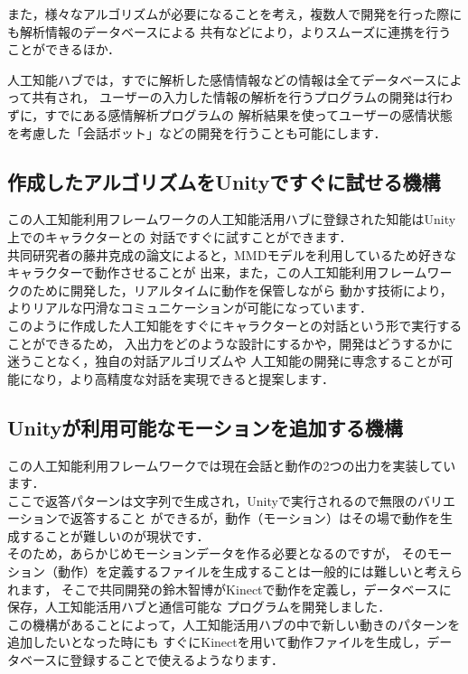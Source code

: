 また，様々なアルゴリズムが必要になることを考え，複数人で開発を行った際にも解析情報のデータベースによる
共有などにより，よりスムーズに連携を行うことができるほか．

人工知能ハブでは，すでに解析した感情情報などの情報は全てデータベースによって共有され，
ユーザーの入力した情報の解析を行うプログラムの開発は行わずに，すでにある感情解析プログラムの
解析結果を使ってユーザーの感情状態を考慮した「会話ボット」などの開発を行うことも可能にします．\\
\subsection{作成したアルゴリズムをUnityですぐに試せる機構}
この人工知能利用フレームワークの人工知能活用ハブに登録された知能はUnity上でのキャラクターとの
対話ですぐに試すことができます．\\

共同研究者の藤井克成の論文\cite{fuji}によると，MMDモデルを利用しているため好きなキャラクターで動作させることが
出来，また，この人工知能利用フレームワークのために開発した，リアルタイムに動作を保管しながら
動かす技術により，よりリアルな円滑なコミュニケーションが可能になっています．\\

このように作成した人工知能をすぐにキャラクターとの対話という形で実行することができるため，
入出力をどのような設計にするかや，開発はどうするかに迷うことなく，独自の対話アルゴリズムや
人工知能の開発に専念することが可能になり，より高精度な対話を実現できると提案します．\\

\subsection{Unityが利用可能なモーションを追加する機構}
この人工知能利用フレームワークでは現在会話と動作の2つの出力を実装しています．\\

ここで返答パターンは文字列で生成され，Unityで実行されるので無限のバリエーションで返答すること
ができるが，動作（モーション）はその場で動作を生成することが難しいのが現状です．\\

そのため，あらかじめモーションデータを作る必要となるのですが，
そのモーション（動作）を定義するファイルを生成することは一般的には難しいと考えられます，
そこで共同開発の鈴木智博がKinectで動作を定義し，データベースに保存，人工知能活用ハブと通信可能な
プログラムを開発しました\cite{suzuki}．\\

この機構があることによって，人工知能活用ハブの中で新しい動きのパターンを追加したいとなった時にも
すぐにKinectを用いて動作ファイルを生成し，データベースに登録することで使えるようなります．

